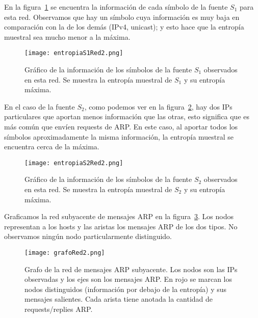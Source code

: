 En la figura~\ref{entropias1_2} se encuentra la información de cada símbolo de la fuente $S_1$ para esta red. Observamos que hay un símbolo cuya información es muy baja en comparación con la de los demás (IPv4, unicast); y esto hace que la entropía muestral sea mucho menor a la máxima.

\begin{figure}[H]
\centering
\texttt{[image: entropiaS1Red2.png]}
\caption{Gráfico de la información de los símbolos de la fuente $S_1$ observados en esta red. Se muestra la entropía muestral de $S_1$ y su entropía máxima.}
\label{entropias1_2}
\end{figure}

En el caso de la fuente $S_2$, como podemos ver en la figura~\ref{entropias2_2}, hay dos IPs particulares que aportan menos información que las otras, esto significa que es más común que envíen requests de ARP. En este caso, al aportar todos los símbolos aproximadamente la misma información, la entropía muestral se encuentra cerca de la máxima.

\begin{figure}[H]
\centering
\texttt{[image: entropiaS2Red2.png]}
\caption{Gráfico de la información de los símbolos de la fuente $S_2$ observados en esta red. Se muestra la entropía muestral de $S_2$ y su entropía máxima.}
\label{entropias2_2}
\end{figure}

Graficamos la red subyacente de mensajes ARP en la figura~\ref{grafo2}. Los nodos representan a los hosts y las aristas los mensajes ARP de los dos tipos. No observamos ningún nodo particularmente distinguido.

\begin{figure}[H]
\centering
\texttt{[image: grafoRed2.png]}
\caption{Grafo de la red de mensajes ARP subyacente. Los nodos son las IPs observadas y los ejes son los mensajes ARP. En rojo se marcan los nodos distinguidos (información por debajo de la entropía) y sus mensajes salientes. Cada arista tiene anotada la cantidad de requests/replies ARP.}
\label{grafo2}
\end{figure}

